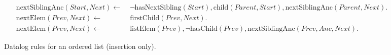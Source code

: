 \documentclass[twocolumn,10pt]{article}
\begin{document}
\begin{figure*}
\begin{align*}
\\
    \mathrm{nextSiblingAnc}(\mathit{Start}, \mathit{Next}) \leftarrow\; &
    \neg\mathrm{hasNextSibling}(\mathit{Start}),
    \mathrm{child}(\mathit{Parent}, \mathit{Start}),
    \mathrm{nextSiblingAnc}(\mathit{Parent}, \mathit{Next}).
\\
    \mathrm{nextElem}(\mathit{Prev}, \mathit{Next}) \leftarrow\; &
    \mathrm{firstChild}(\mathit{Prev}, \mathit{Next}).
\\
    \mathrm{nextElem}(\mathit{Prev}, \mathit{Next}) \leftarrow\; &
    \mathrm{listElem}(\mathit{Prev}),
    \neg\mathrm{hasChild}(\mathit{Prev}),
    \mathrm{nextSiblingAnc}(\mathit{Prev}, \mathit{Anc}, \mathit{Next}).
\end{align*}
\caption{Datalog rules for an ordered list (insertion only).}
\end{figure*}

{\footnotesize

{}}
\end{document}
